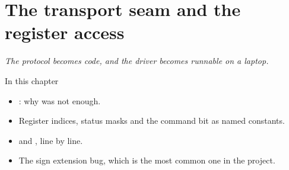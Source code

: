 \chapter{The transport seam and the register access}
\label{ch:byte}


{\large\itshape The protocol becomes code, and the driver becomes runnable on a laptop.\par}

\begin{chapterbox}{In this chapter}
\begin{itemize}
  \item {}: why  was not enough.
  \item Register indices, status masks and the command bit as named constants.
  \item {} and , line by line.
  \item The sign extension bug, which is the most common one in the project.
\end{itemize}
\end{chapterbox}




